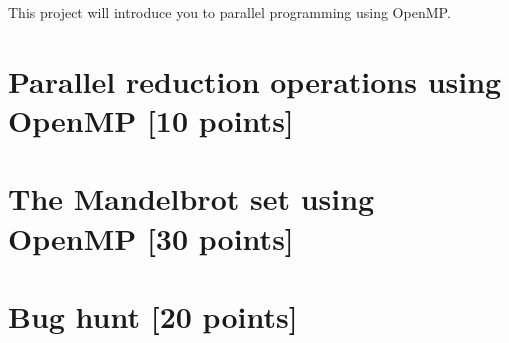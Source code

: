 \documentclass[unicode,11pt,a4paper,oneside,numbers=endperiod,openany]{scrartcl}
\begin{document}
\setassignment
{}

\newline

\assignmentpolicy
This project will introduce you to parallel programming using OpenMP.


\section{Parallel reduction operations using OpenMP [10 points]}



\section{The Mandelbrot set using OpenMP [30 points]}



\section{Bug hunt [20 points]}


\end{document}
